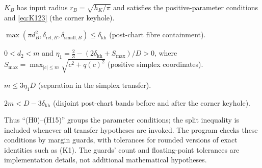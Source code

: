 \begin{description}[leftmargin=4em,labelwidth=3.5em]
\item[(H12)] $K_B$ has input radius $r_B=\sqrt{h_K/\pi}$ and satisfies the positive-parameter conditions and
\eqref{eq:K123} (the corner keyhole).
\item[(H13)] $\max(\pi d_B^2,\delta_{\mathrm{rel},B},\delta_{\mathrm{small},B})\le\delta_{\mathrm{kh}}$
(post-chart fibre containment).
\item[(H14)] $0<d_2<m$ and $\eta_1=\frac23-(2\delta_{\mathrm{kh}}+S_{\max})/D>0$, where
$S_{\max}=\max_{|c|\le m}\sqrt{c^2+q(c)^2}$ (positive simplex coordinates).
\item[(H15)] $m\le3\eta_1D$ (separation in the simplex transfer).
\item[Split] $2m<D-3\delta_{\mathrm{kh}}$ (disjoint post-chart bands before and after the corner keyhole).
\end{description}

Thus ``(H0)--(H15)'' groups the parameter conditions; the split inequality is included whenever all transfer
hypotheses are invoked. The program checks these conditions by margin guards, with tolerances for rounded versions
of exact identities such as (K1). The guards' count and floating-point tolerances are implementation details,
not additional mathematical hypotheses.
